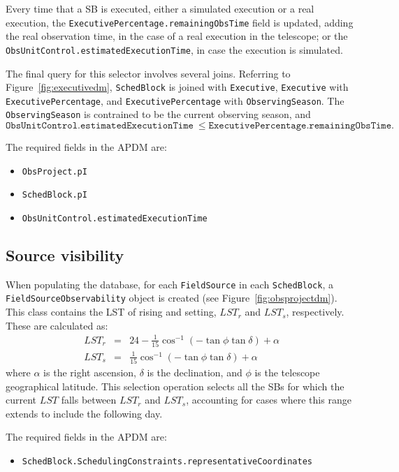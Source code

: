 \documentclass{article}
\begin{document}
Every time that a SB is executed, either a simulated execution or a real execution, the
{\tt ExecutivePercentage.remainingObsTime} field is updated, adding the real observation time,
in the case of a real execution in the telescope; or the {\tt ObsUnitControl.estimatedExecutionTime},
in case the execution is simulated.

The final query for this selector involves several joins. Referring to Figure~\ref{fig:executivedm},
{\tt SchedBlock} is joined with {\tt Executive}, {\tt Executive} with {\tt ExecutivePercentage}, and
{\tt ExecutivePercentage} with {\tt ObservingSeason}. The {\tt ObservingSeason} is contrained to be
the current observing season, and
$$
\mathtt{ObsUnitControl.estimatedExecutionTime}\ \leq \mathtt{ExecutivePercentage.remainingObsTime}.
$$

The required fields in the APDM are:
\begin{itemize}
\item {\tt ObsProject.pI}
\item {\tt SchedBlock.pI}
\item {\tt ObsUnitControl.estimatedExecutionTime}
\end{itemize}

\subsection{Source visibility}

When populating the database, for each {\tt FieldSource} in each {\tt SchedBlock},
a {\tt FieldSourceObservability} object is created (see Figure~\ref{fig:obsprojectdm}).
This class contains the LST of rising and
setting, $LST_r$ and $LST_s$, respectively. These are calculated as:
\begin{eqnarray*}
LST_r & = & 24 - \frac{1}{15} \cos^{-1} (-\tan\phi\tan\delta) + \alpha \\
LST_s & = & \frac{1}{15} \cos^{-1} (-\tan\phi \tan\delta) + \alpha
\end{eqnarray*}
where $\alpha$ is the right ascension, $\delta$ is the declination, and
$\phi$ is the telescope geographical latitude.
This selection operation selects all the SBs for which the current $LST$ falls
between $LST_r$ and $LST_s$, accounting for cases where this range extends to include
the following day.

%
%

The required fields in the APDM are:
\begin{itemize}
\item {\tt SchedBlock.SchedulingConstraints.representativeCoordinates}
\end{itemize}
\end{document}
